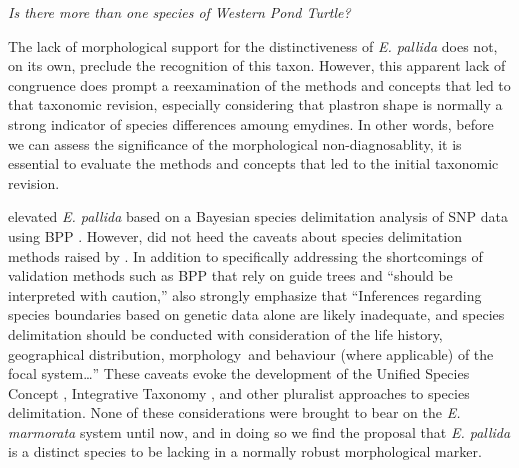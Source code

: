 \documentclass[12pt,letterpaper]{article}
\renewcommand{\subsection}[1]{%
\bigskip
\begin{center}
\begin{large}
\normalfont\itshape #1
\end{large}
\end{center}}
\begin{document}
\subsection{Is there more than one species of Western Pond Turtle?}

The lack of morphological support for the distinctiveness of \textit{E. pallida} does not, on its own, preclude the recognition of this taxon. However, this apparent lack of congruence does prompt a reexamination of the methods and concepts that led to that taxonomic revision, especially considering that plastron shape is normally a strong indicator of species differences amoung emydines. In other words, before we can assess the significance of the morphological non-diagnosablity, it is essential to evaluate the methods and concepts that led to the initial taxonomic revision. 

\citet{Spinks2014} elevated \textit{E. pallida} based on a Bayesian species delimitation analysis of SNP data using BPP \citep{Yang2010b}. However, \citet{Spinks2014} did not heed the caveats about species delimitation methods raised by \citet{Carstens2013}. In addition to specifically addressing the shortcomings of validation methods such as BPP that rely on guide trees and ``should be interpreted with caution,'' \citet{Carstens2013} also strongly emphasize that ``Inferences regarding species boundaries based on genetic data alone are likely inadequate, and species delimitation should be conducted with consideration of the life history, geographical distribution, morphology and behaviour (where applicable) of the focal system\dots'' These caveats evoke the development of the Unified Species Concept \citep{Dayrat2005a,DeQueiroz2007b}, Integrative Taxonomy \citep{Padial2010}, and other pluralist approaches to species delimitation. None of these considerations were brought to bear on the \textit{E. marmorata} system until now, and in doing so we find the proposal that \textit{E. pallida} is a distinct species to be lacking in a normally robust morphological marker.
\end{document}
